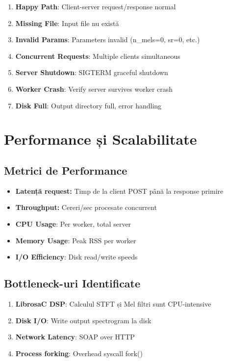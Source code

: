 \documentclass[12pt,a4paper,twoside]{article}
\begin{document}
\begin{itemize}
\begin{enumerate}
    \item \textbf{Happy Path}: Client-server request/response normal
    \item \textbf{Missing File}: Input file nu există
    \item \textbf{Invalid Params}: Parameters invalid (n\_mels=0, sr=0, etc.)
    \item \textbf{Concurrent Requests}: Multiple clients simultaneous
    \item \textbf{Server Shutdown}: SIGTERM graceful shutdown
    \item \textbf{Worker Crash}: Verify server survives worker crash
    \item \textbf{Disk Full}: Output directory full, error handling
\end{enumerate}

\section{Performance și Scalabilitate}

\subsection{Metrici de Performance}

\begin{itemize}
    \item \textbf{Latență request:} Timp de la client POST până la response primire
    \item \textbf{Throughput:} Cereri/sec procesate concurrent
    \item \textbf{CPU Usage}: Per worker, total server
    \item \textbf{Memory Usage}: Peak RSS per worker
    \item \textbf{I/O Efficiency}: Disk read/write speeds
\end{itemize}

\subsection{Bottleneck-uri Identificate}

\begin{enumerate}
    \item \textbf{LibrosaC DSP}: Calculul STFT și Mel filtri sunt CPU-intensive
    \item \textbf{Disk I/O}: Write output spectrogram la disk
    \item \textbf{Network Latency}: SOAP over HTTP
    \item \textbf{Process forking}: Overhead syscall fork()
\end{enumerate}


\end{itemize}
\end{document}
